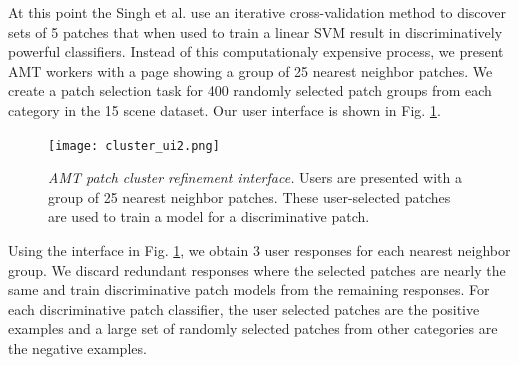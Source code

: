 \documentclass[10pt,twocolumn,letterpaper]{article}
\begin{document}
At this point the Singh et al. use an iterative cross-validation method to discover sets of 5 patches that when used to train a linear SVM result in discriminatively powerful classifiers. Instead of this computationaly expensive process, we present AMT workers with a page showing a group of 25 nearest neighbor patches. We create a patch selection task for 400 randomly selected patch groups from each category in the 15 scene dataset. Our user interface is shown in Fig. \ref{fig:ui}.

\begin{figure}
\centering
 \texttt{[image: cluster\_ui2.png]}
 \caption{\small \textit{AMT patch cluster refinement interface.} Users are presented with a group of 25 nearest neighbor patches. These user-selected patches are used to train a model for a discriminative patch. }
\vspace{-4mm}
 \label{fig:ui}
\end{figure}


Using the interface in Fig. \ref{fig:ui}, we obtain 3 user responses for each nearest neighbor group.
We discard redundant responses where the selected patches are nearly the same and train discriminative patch models from the remaining responses. For each discriminative patch classifier, the user selected patches are the positive examples and a large set of randomly selected patches from other categories are the negative examples.
\end{document}
